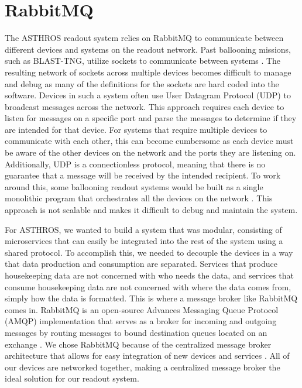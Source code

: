 \section{RabbitMQ}
\label{readout/section:rmqtools}
The ASTHROS readout system relies on RabbitMQ to communicate between different devices and systems on the readout network.
Past ballooning missions, such as BLAST-TNG, utilize sockets to communicate between systems \parencite{gordon2019highly}.
The resulting network of sockets across multiple devices becomes difficult to manage and debug as many of the definitions for the sockets are hard coded into the software.
Devices in such a system often use User Datagram Protocol (UDP) to broadcast messages across the network.
This approach requires each device to listen for messages on a specific port and parse the messages to determine if they are intended for that device.
For systems that require multiple devices to communicate with each other, this can become cumbersome as each device must be aware of the other devices on the network and the ports they are listening on.
Additionally, UDP is a connectionless protocol, meaning that there is no guarantee that a message will be received by the intended recipient.
To work around this, some ballooning readout systems would be built as a single monolithic program that orchestrates all the devices on the network \parencite{gordon2019highly}.
This approach is not scalable and makes it difficult to debug and maintain the system.

For ASTHROS, we wanted to build a system that was modular, consisting of microservices that can easily be integrated into the rest of the system using a shared protocol.
To accomplish this, we needed to decouple the devices in a way that data production and consumption are separated.
Services that produce housekeeping data are not concerned with who needs the data, and services that consume housekeeping data are not concerned with where the data comes from, simply how the data is formatted. 
This is where a message broker like RabbitMQ comes in.
RabbitMQ is an open-source Advances Messaging Queue Protocol (AMQP) implementation that serves as a broker for incoming and outgoing messages by routing messages to bound destination queues located on an exchange \parencite{dunne2018comparison}.
We chose RabbitMQ because of the centralized message broker architecture that allows for easy integration of new devices and services \parencite{toshev2015learning}.
All of our devices are networked together, making a centralized message broker the ideal solution for our readout system.

